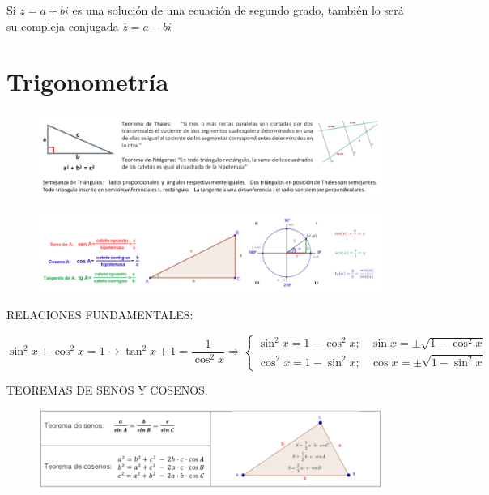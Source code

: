 Si $z=a+bi$ es una solución de una ecuación de segundo grado, también lo será su compleja conjugada $\overline{z}=a-bi$
 
\section{Trigonometría}

	\begin{figure}[H]
		\centering
		\includegraphics[width=1\textwidth]{imagenes/apendices/APENDICESIM04.png}
	\end{figure}

	\begin{figure}[H]
		\centering
		\includegraphics[width=1\textwidth]{imagenes/apendices/APENDICESIM05.png}
	\end{figure}

RELACIONES FUNDAMENTALES:

$\sin^2 x + \cos^2 x = 1 \to \tan^2 x + 1 = \dfrac {1}{\cos^2 x} \Rightarrow \begin{cases}
 	\sin^2 x = 1 - \cos^2 x ; & \sin x = \pm \sqrt{1-\cos^2 x} \\
 	\cos^2 x = 1 - \sin^2 x ; & \cos x = \pm \sqrt{1-\sin^2 x} 
 	\end{cases}$

	TEOREMAS DE SENOS Y COSENOS:
	
	\begin{figure}[H]
		\centering
		\includegraphics[width=1\textwidth]{imagenes/apendices/APENDICESIM06.png}
	\end{figure}


